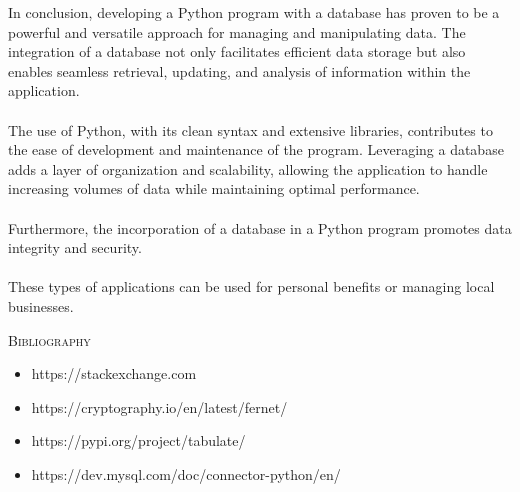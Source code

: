 \documentclass[12pt,a4paper]{article}
\begin{document}
	\begin{normalsize}
		{}
		\vspace{1cm}
		In conclusion, developing a Python program with a database has proven to be a powerful and versatile approach for managing and manipulating data. The integration of a database not only facilitates efficient data storage but also enables seamless retrieval, updating, and analysis of information within the application.\\
		\\
		The use of Python, with its clean syntax and extensive libraries, contributes to the ease of development and maintenance of the program. Leveraging a database adds a layer of organization and scalability, allowing the application to handle increasing volumes of data while maintaining optimal performance.\\
		\\
		Furthermore, the incorporation of a database in a Python program promotes data integrity and security. \\
		\\
		These types of applications can be used for personal benefits or managing local businesses. 
		
	\end{normalsize}
	\newpage
	\begin{normalsize}
		{{\centering\scshape\huge Bibliography\par}}\vspace{0.5cm}
		\begin{itemize}
			\item https://stackexchange.com
			\item https://cryptography.io/en/latest/fernet/
			\item https://pypi.org/project/tabulate/
			\item https://dev.mysql.com/doc/connector-python/en/
		\end{itemize}
	\end{normalsize}
	
\end{document}
